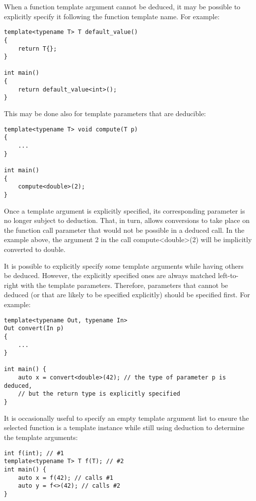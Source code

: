 When a function template argument cannot be deduced, it may be possible to explicitly specify it following the function template name. For example:

\begin{lstlisting}[style=styleCXX]
template<typename T> T default_value()
{
	return T{};
}

int main()
{
	return default_value<int>();
}
\end{lstlisting}

This may be done also for template parameters that are deducible:

\begin{lstlisting}[style=styleCXX]
template<typename T> void compute(T p)
{
	...
}

int main()
{
	compute<double>(2);
}
\end{lstlisting}

Once a template argument is explicitly specified, its corresponding parameter is no longer subject to deduction. That, in turn, allows conversions to take place on the function call parameter that would not be possible in a deduced call. In the example above, the argument 2 in the call compute<double>(2) will be implicitly converted to double.

It is possible to explicitly specify some template arguments while having others be deduced. However, the explicitly specified ones are always matched left-to-right with the template parameters. Therefore, parameters that cannot be deduced (or that are likely to be specified explicitly) should be specified first. For example:

\begin{lstlisting}[style=styleCXX]
template<typename Out, typename In>
Out convert(In p)
{
	...
}

int main() {
	auto x = convert<double>(42); // the type of parameter p is deduced,
	// but the return type is explicitly specified
}
\end{lstlisting}

It is occasionally useful to specify an empty template argument list to ensure the selected function is a template instance while still using deduction to determine the template arguments:

\begin{lstlisting}[style=styleCXX]
int f(int); // #1
template<typename T> T f(T); // #2
int main() {
	auto x = f(42); // calls #1
	auto y = f<>(42); // calls #2
}
\end{lstlisting}

